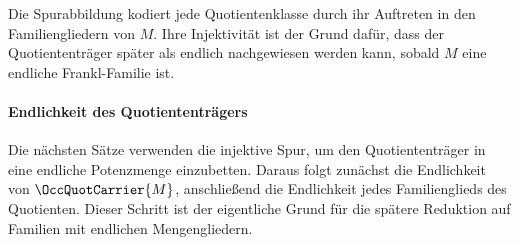 \documentclass[main.tex]{subfiles}
\begin{document}
Die Spurabbildung kodiert jede Quotientenklasse durch ihr Auftreten in den
Familiengliedern von \(M\). Ihre Injektivität ist der Grund dafür, dass der
Quotiententräger später als endlich nachgewiesen werden kann, sobald \(M\) eine
endliche Frankl-Familie ist.

\begin{tabproofwide}
\end{tabproofwide}

\paragraph{Endlichkeit des Quotiententrägers}

Die nächsten Sätze verwenden die injektive Spur, um den Quotiententräger in
eine endliche Potenzmenge einzubetten. Daraus folgt zunächst die Endlichkeit von
\(\OccQuotCarrier{M}\), anschließend die Endlichkeit jedes Familienglieds des
Quotienten. Dieser Schritt ist der eigentliche Grund für die spätere Reduktion
auf Familien mit endlichen Mengengliedern.

\begin{tabproof}
\end{tabproof}
\end{document}

